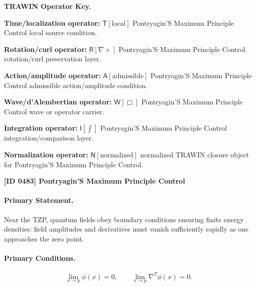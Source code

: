 \par\vspace{0.45\baselineskip}
\noindent\begin{minipage}[t]{\linewidth}
\begingroup
\small
\raggedright
\textbf{TRAWIN Operator Key.}\par
\noindent\textbf{Time/localization operator:} $\mathsf{T}\!\left[\mathrm{local}\right]$ Pontryagin'S Maximum Principle Control local source condition.\par
\noindent\textbf{Rotation/curl operator:} $\mathsf{R}\!\left[\nabla\times\right]$ Pontryagin'S Maximum Principle Control rotation/curl preservation layer.\par
\noindent\textbf{Action/amplitude operator:} $\mathsf{A}\!\left[\mathrm{admissible}\right]$ Pontryagin'S Maximum Principle Control admissible action/amplitude condition.\par
\noindent\textbf{Wave/d'Alembertian operator:} $\mathsf{W}\!\left[\Box\right]$ Pontryagin'S Maximum Principle Control wave or operator carrier.\par
\noindent\textbf{Integration operator:} $\mathsf{I}\!\left[\int\right]$ Pontryagin'S Maximum Principle Control integration/comparison layer.\par
\noindent\textbf{Normalization operator:} $\mathsf{N}\!\left[\mathrm{normalized}\right]$ normalized TRAWIN closure object for Pontryagin'S Maximum Principle Control.\par
\endgroup
\end{minipage}

\clearpage
\noindent\textbf{[ID 0483] Pontryagin'S Maximum Principle Control}\par
\vspace{0.35em}
\paragraph{Primary Statement.}
Near the TZP, quantum fields obey boundary conditions ensuring finite energy densities: field amplitudes and derivatives must vanish sufficiently rapidly as one approaches the zero point.

\paragraph{Primary Conditions.}
\begin{equation}
\lim_{x\to p}\phi(x)=0,
\qquad
\lim_{x\to p}\nabla^T\phi(x)=0 .
\end{equation}


